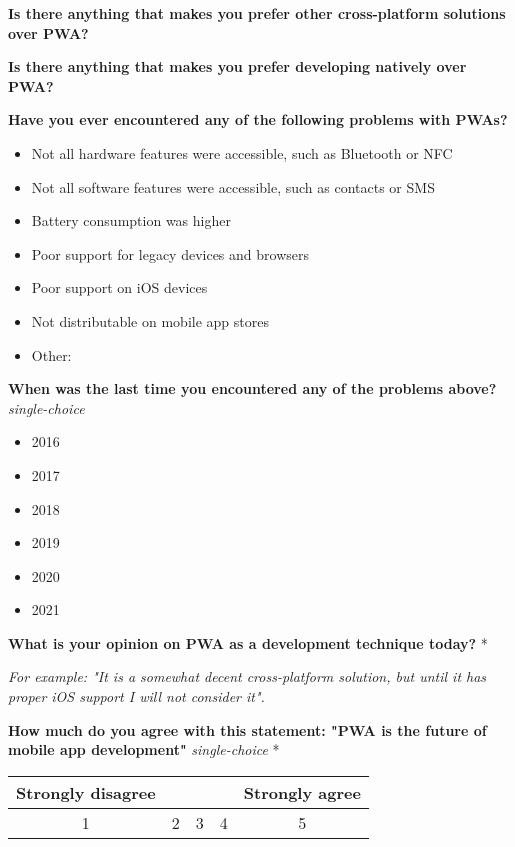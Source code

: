 \documentclass[a4paper,12pt]{article}
\begin{document}
\textbf{Is there anything that makes you prefer other cross-platform solutions over PWA?}

\quad

\textbf{Is there anything that makes you prefer developing natively over PWA?}

\quad

\textbf{Have you ever encountered any of the following problems with PWAs?}
\begin{itemize}
    \item Not all hardware features were accessible, such as Bluetooth or NFC
    \item Not all software features were accessible, such as contacts or SMS
    \item Battery consumption was higher
    \item Poor support for legacy devices and browsers
    \item Poor support on iOS devices
    \item Not distributable on mobile app stores
    \item Other:
\end{itemize}

\textbf{When was the last time you encountered any of the problems above?} \textit{single-choice} 
\begin{itemize}
    \item 2016
    \item 2017
    \item 2018
    \item 2019
    \item 2020
    \item 2021
\end{itemize}

\textbf{What is your opinion on PWA as a development technique today?} *

\textit{For example: "It is a somewhat decent cross-platform solution, but until it has proper iOS support I will not consider it".}

\quad

\textbf{How much do you agree with this statement: "PWA is the future of mobile app development"} \textit{single-choice}  *

\begin{tabular}{ccccc}
    Strongly disagree & & & & Strongly agree \\
    \hline
    \multicolumn{1}{|c|}{1} & \multicolumn{1}{c|}{2} & \multicolumn{1}{c|}{3} & \multicolumn{1}{c|}{4} & \multicolumn{1}{c|}{5} \\
     \hline
\end{tabular}
\end{document}
